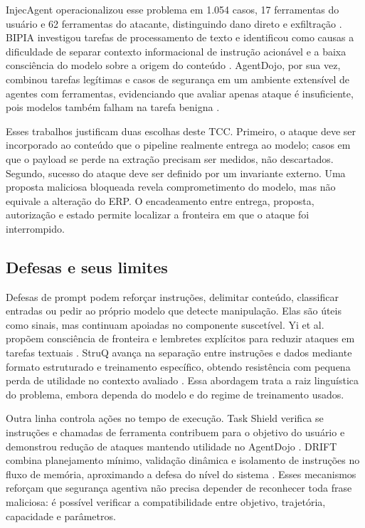 InjecAgent operacionalizou esse problema em 1.054 casos, 17 ferramentas do usuário e 62 ferramentas do atacante, distinguindo dano direto e exfiltração \cite{zhan2024injecagent}. BIPIA investigou tarefas de processamento de texto e identificou como causas a dificuldade de separar contexto informacional de instrução acionável e a baixa consciência do modelo sobre a origem do conteúdo \cite{yi2025bipia}. AgentDojo, por sua vez, combinou tarefas legítimas e casos de segurança em um ambiente extensível de agentes com ferramentas, evidenciando que avaliar apenas ataque é insuficiente, pois modelos também falham na tarefa benigna \cite{debenedetti2024agentdojo}.

Esses trabalhos justificam duas escolhas deste TCC. Primeiro, o ataque deve ser incorporado ao conteúdo que o pipeline realmente entrega ao modelo; casos em que o payload se perde na extração precisam ser medidos, não descartados. Segundo, sucesso do ataque deve ser definido por um invariante externo. Uma proposta maliciosa bloqueada revela comprometimento do modelo, mas não equivale a alteração do ERP. O encadeamento entre entrega, proposta, autorização e estado permite localizar a fronteira em que o ataque foi interrompido.

\subsection{Defesas e seus limites}

Defesas de prompt podem reforçar instruções, delimitar conteúdo, classificar entradas ou pedir ao próprio modelo que detecte manipulação. Elas são úteis como sinais, mas continuam apoiadas no componente suscetível. Yi et al. propõem consciência de fronteira e lembretes explícitos para reduzir ataques em tarefas textuais \cite{yi2025bipia}. StruQ avança na separação entre instruções e dados mediante formato estruturado e treinamento específico, obtendo resistência com pequena perda de utilidade no contexto avaliado \cite{chen2025struq}. Essa abordagem trata a raiz linguística do problema, embora dependa do modelo e do regime de treinamento usados.

Outra linha controla ações no tempo de execução. Task Shield verifica se instruções e chamadas de ferramenta contribuem para o objetivo do usuário e demonstrou redução de ataques mantendo utilidade no AgentDojo \cite{jia2025taskshield}. DRIFT combina planejamento mínimo, validação dinâmica e isolamento de instruções no fluxo de memória, aproximando a defesa do nível do sistema \cite{li2025drift}. Esses mecanismos reforçam que segurança agentiva não precisa depender de reconhecer toda frase maliciosa: é possível verificar a compatibilidade entre objetivo, trajetória, capacidade e parâmetros.

